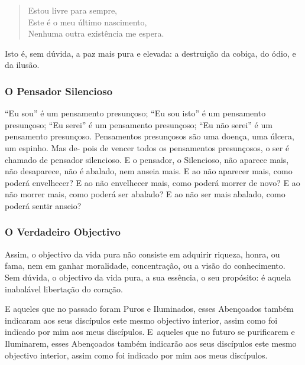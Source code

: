 
\enlargethispage{\baselineskip}

\begin{verse}
  Estou livre para sempre,\\
  Este é o meu último nascimento,\\
  Nenhuma outra existência me espera.

\end{verse}

Isto é, sem dúvida, a paz mais pura e elevada: a destruição da cobiça, do ódio,
e da ilusão.

\subsubsection{O Pensador Silencioso}

“Eu sou” é um pensamento presunçoso; “Eu sou isto” é um pensamento
presunçoso; “Eu serei” é um pensamento presunçoso; “Eu não serei” é um
pensamento presunçoso. Pensamentos presunçosos são uma doença, uma úlcera, um
espinho. Mas de- pois de vencer todos os pensamentos presunçosos, o ser é
chamado de pensador silencioso. E o pensador, o Silencioso, não aparece mais,
não desaparece, não é abalado, nem anseia mais. E ao não aparecer mais, como
poderá envelhecer? E ao não envelhecer mais, como poderá morrer de novo? E ao
não morrer mais, como poderá ser abalado? E ao não ser mais abalado, como poderá
sentir anseio?


\subsubsection{O Verdadeiro Objectivo}

Assim, o objectivo da vida pura não consiste em adquirir riqueza, honra, ou
fama, nem em ganhar moralidade, concentração, ou a visão do conhecimento. Sem
dúvida, o objectivo da vida pura, a sua essência, o seu propósito: é aquela
inabalável libertação do coração.


E aqueles que no passado foram Puros e Iluminados, esses Abençoados também
indicaram aos seus discípulos este mesmo objectivo interior, assim como foi
indicado por mim aos meus discípulos. E~aqueles que no futuro se purificarem e
Iluminarem, esses Abençoados também indicarão aos seus discípulos este mesmo
objectivo interior, assim como foi indicado por mim aos meus discípulos.

